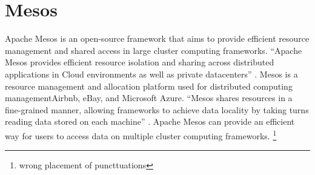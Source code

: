 \section{Mesos}

Apache Mesos is an open-source framework that aims to provide efficient
resource management and shared access in large cluster computing frameworks. 
``Apache Mesos provides efficient resource isolation and 
sharing across distributed applications in Cloud environments
as well as private datacenters'' \cite{hid-sp18-407-mesos-1}.
Mesos is a resource management and allocation platform used for 
distributed computing managementAirbnb, eBay, and Microsoft Azure. 
``Mesos shares resources in a fine-grained manner, allowing 
frameworks to achieve data locality by taking turns reading data 
stored on each machine'' \cite{hid-sp18-407-mesos-2}.
Apache Mesos can provide an efficient way for users to access 
data on multiple cluster computing frameworks. \cite{hid-sp18-407-mesos-2}
\footnote{wrong placement of puncttuations}